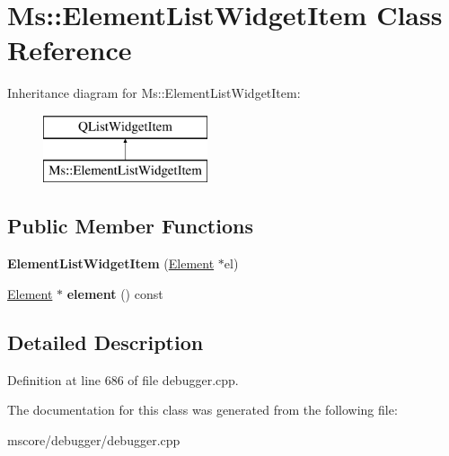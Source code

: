 \hypertarget{class_ms_1_1_element_list_widget_item}{}\section{Ms\+:\+:Element\+List\+Widget\+Item Class Reference}
\label{class_ms_1_1_element_list_widget_item}
Inheritance diagram for Ms\+:\+:Element\+List\+Widget\+Item\+:\begin{figure}[H]
\begin{center}
\leavevmode
\includegraphics[height=2.000000cm]{class_ms_1_1_element_list_widget_item}
\end{center}
\end{figure}
\subsection*{Public Member Functions}
\begin{DoxyCompactItemize}
\item 
\mbox{\label{class_ms_1_1_element_list_widget_item_a3a9fea736380c18ad668b40333e729fb}} 
{\bfseries Element\+List\+Widget\+Item} (\hyperlink{class_ms_1_1_element}{Element} $\ast$el)
\item 
\mbox{\label{class_ms_1_1_element_list_widget_item_ac16d945fd228e6889ea89689dcf256ff}} 
\hyperlink{class_ms_1_1_element}{Element} $\ast$ {\bfseries element} () const
\end{DoxyCompactItemize}


\subsection{Detailed Description}


Definition at line 686 of file debugger.\+cpp.



The documentation for this class was generated from the following file\+:\begin{DoxyCompactItemize}
\item 
mscore/debugger/debugger.\+cpp\end{DoxyCompactItemize}
